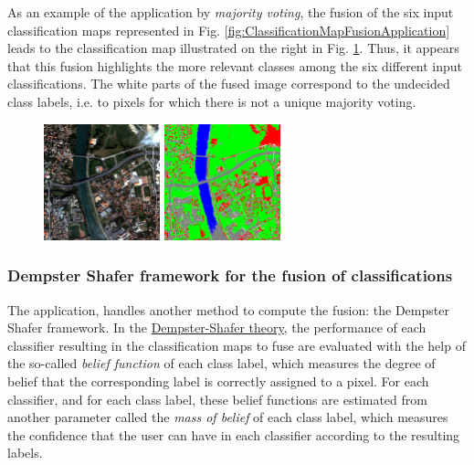 As an example of the  application by 
\emph{majority voting}, the fusion of the six input classification maps 
represented in Fig. \ref{fig:ClassificationMapFusionApplication} leads to the 
classification map illustrated on the right in Fig. \ref{fig:ClassificationMapFusionApplicationMV}. 
Thus, it appears that this fusion highlights the more relevant classes among the six  
different input classifications. The white parts of the fused image correspond to 
the undecided class labels, i.e. to pixels for which there is not a unique 
majority voting.


\begin{figure}[!h]
  \center
  \includegraphics[width=0.3\textwidth]{../Art/MonteverdiImages/classification_chain_inputimage.jpg}
  \includegraphics[width=0.3\textwidth]{../Art/MonteverdiImages/QB_1_ortho_MV_C123456_CM.png}
  \label{fig:ClassificationMapFusionApplicationMV}
\end{figure}


\subsubsection{Dempster Shafer framework for the fusion of classifications}

The  application, handles another method to 
compute the fusion: the Dempster Shafer framework. 
In the \href{http://en.wikipedia.org/wiki/Dempster\%E2\%80\%93Shafer_theory}{Dempster-Shafer theory}, 
the performance of each classifier resulting in the classification maps to fuse are 
evaluated with the help of the so-called \emph{belief function} of each class label, 
which measures the degree of belief that the corresponding label is correctly assigned 
to a pixel. For each classifier, and for each class label, these belief
functions are estimated from another parameter called the \emph{mass of belief} of each class label, 
which measures the confidence that the user can have in each classifier according to 
the resulting labels.

